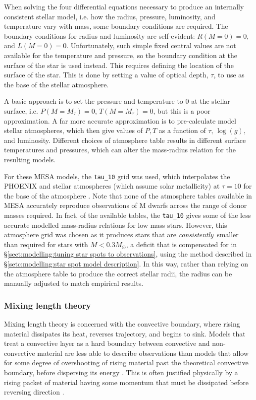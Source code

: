 When solving the four differential equations necessary to produce an internally consistent stellar model, i.e. how the radius, pressure, luminosity, and temperature vary with mass, some boundary conditions are required.
The boundary conditions for radius and luminosity are self-evident: $R(M = 0) = 0$, and $L(M = 0) = 0$. Unfortunately, such simple fixed central values are not available for the temperature and pressure, so the boundary condition at the surface of the star is used instead.
This requires defining the location of the surface of the star. This is done by setting a value of optical depth, $\tau$, to use as the base of the stellar atmosphere.

A basic approach is to set the pressure and temperature to 0 at the stellar surface, i.e. $P(M = M_\tau) = 0$, $T(M = M_\tau) = 0$, but this is a poor approximation.
A far more accurate approximation is to pre-calculate model stellar atmospheres, which then give values of $P, T$ as a function of $\tau$, $\log(g)$, and luminosity.
Different choices of atmosphere table results in different surface temperatures and pressures, which can alter the mass-radius relation for the resulting models.

For these MESA models, the \lstinline{tau_10} grid was used, which interpolates the PHOENIX \citep{hauschildt1999, hauschildt2001} and \citet{castelli2003} stellar atmospheres (which assume solar metallicity) at $\tau = 10$ for the base of the atmosphere \citep{paxton2010,paxton2011}.
Note that none of the atmosphere tables available in MESA accurately reproduce observations of M dwarfs across the range of donor masses required. In fact, of the available tables, the \lstinline{tau_10} gives some of the less accurate modelled mass-radius relations for low mass stars.
However, this atmosphere grid was chosen as it produces stars that are {\it consistently}\ smaller than required for stars with $M < 0.3 M_\odot$, a deficit that is compensated for in \S\ref{sect:modelling:tuning star spots to observations}, using the method described in \S\ref{setc:modelling:star spot model description}. In this way, rather than relying on the atmosphere table to produce the correct stellar radii, the radius can be manually adjusted to match empirical results.


\subsubsection{Mixing length theory}

Mixing length theory is concerned with the convective boundary, where rising material dissipates its heat, reverses trajectory, and begins to sink.
Models that treat a convective layer as a hard boundary between convective and non-convective material are less able to describe observations than models that allow for some degree of overshooting of rising material past the theoretical convective boundary, before dispersing its energy \citep{prandtl1925}. This is often justified physically by a rising packet of material having some momentum that must be dissipated before reversing direction \citep{bradshaw1974}.

